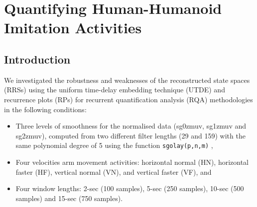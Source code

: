 
\chapter{Quantifying Human-Humanoid Imitation Activities} \label{chapter6}
%
\graphicspath{{figs/chapter6/PDF/}}


%
%


\section{Introduction} 

We investigated the robustness and weaknesses of the reconstructed 
state spaces (RRSs) using the uniform time-delay embedding technique (UTDE) 
and recurrence plots (RPs) for recurrent quantification analysis (RQA) 
methodologies in the following conditions: 
\begin{itemize}

\item Three levels of smoothness for the normalised data 
(sg0zmuv, sg1zmuv and sg2zmuv), computed from two different filter 
lengths (29 and 159) with the same polynomial degree of 5 using the 
function \texttt{sgolay(p,n,m)} \cite{Rsignal},

\item Four velocities arm movement activities: horizontal normal (HN), 
	horizontal faster (HF), vertical normal (VN), and 
	vertical faster (VF), and
\item Four window lengths: 2-sec (100 samples), 5-sec (250 samples), 
	10-sec (500 samples) and 15-sec (750 samples).
\end{itemize}

